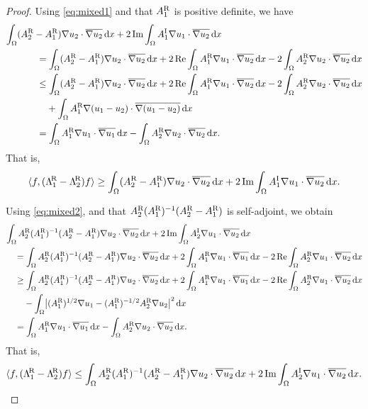 \documentclass[reqno]{amsart}
\numberwithin{equation}{section}
\numberwithin{figure}{section}
\numberwithin{table}{section}
\theoremstyle{plain}
\theoremstyle{definition}
\theoremstyle{remark}
\newcommand{\inner}[1]{\langle#1\rangle}
\newcommand{\redel}{\mathop{\textup{Re}}}
\newcommand{\imdel}{\mathop{\textup{Im}}}
\newcommand{\di}{\mathrm{d}}   %
\newcommand{\upR}{^{\textup{R}}}
\newcommand{\upI}{^{\textup{I}}}
\newcommand{\uptR}{^{\!\textup{R}}}
\newcommand{\LambdaR}{\Lambda\uptR}
\newcommand{\AR}{A\upR}
\newcommand{\AI}{A\upI}
\begin{document}
\begin{proof}
		Using \eqref{eq:mixed1} and that $\AR_1$ is positive definite, we have
		\begin{align*}
			\int_\Omega (\AR_2 - \AR_1)\nabla u_2\cdot\overline{\nabla u_2}\,\di x + 2\imdel\int_\Omega \AI_1\nabla u_1\cdot\overline{\nabla u_2}\,\di x \hspace{-7cm}& \\
			&= \int_\Omega (\AR_2 - \AR_1)\nabla u_2\cdot\overline{\nabla u_2}\,\di x + 2\redel \int_\Omega \AR_1\nabla u_1\cdot\overline{\nabla u_2}\,\di x - 2\int_\Omega \AR_2 \nabla u_2\cdot\overline{\nabla u_2}\,\di x \\
			&\leq \int_\Omega (\AR_2 - \AR_1)\nabla u_2\cdot\overline{\nabla u_2}\,\di x + 2\redel \int_\Omega \AR_1\nabla u_1\cdot\overline{\nabla u_2}\,\di x - 2\int_\Omega \AR_2 \nabla u_2\cdot\overline{\nabla u_2}\,\di x\\
			&\phantom{={}} + \int_\Omega \AR_1\nabla(u_1-u_2)\cdot\overline{\nabla(u_1-u_2)}\,\di x\\
			&= \int_\Omega \AR_1\nabla u_1\cdot\overline{\nabla u_1}\,\di x - \int_\Omega \AR_2 \nabla u_2\cdot\overline{\nabla u_2}\,\di x.
		\end{align*}
		That is, 
		\begin{equation*}
			\inner{f,(\LambdaR_1-\LambdaR_2)f} \geq \int_\Omega (\AR_2 - \AR_1)\nabla u_2\cdot\overline{\nabla u_2}\,\di x + 2\imdel\int_\Omega \AI_1\nabla u_1\cdot\overline{\nabla u_2}\,\di x.
		\end{equation*}
		
		Using \eqref{eq:mixed2}, and that $\AR_2(\AR_1)^{-1}(\AR_2 - \AR_1)$ is self-adjoint, we obtain
		\begin{align*}
			\int_\Omega \AR_2(\AR_1)^{-1}(\AR_2 - \AR_1) \nabla u_2\cdot\overline{\nabla u_2}\,\di x + 2\imdel \int_\Omega \AI_2\nabla u_1\cdot\overline{\nabla u_2}\,\di x \hspace{-9.5cm}& \\
			&= \int_\Omega \AR_2(\AR_1)^{-1}(\AR_2 - \AR_1) \nabla u_2\cdot\overline{\nabla u_2}\,\di x + 2\int_\Omega \AR_1 \nabla u_1\cdot\overline{\nabla u_1}\,\di x - 2\redel \int_\Omega \AR_2\nabla u_1\cdot\overline{\nabla u_2}\,\di x \\
			&\geq \int_\Omega \AR_2(\AR_1)^{-1}(\AR_2 - \AR_1) \nabla u_2\cdot\overline{\nabla u_2}\,\di x + 2\int_\Omega \AR_1 \nabla u_1\cdot\overline{\nabla u_1}\,\di x - 2\redel \int_\Omega \AR_2\nabla u_1\cdot\overline{\nabla u_2}\,\di x \\
			&\phantom{={}} - \int_\Omega \bigl\lvert (\AR_1)^{1/2}\nabla u_1 - (\AR_1)^{-1/2}\AR_2\nabla u_2 \bigr\rvert^2\,\di x \\
			&= \int_\Omega \AR_1\nabla u_1\cdot\overline{\nabla u_1}\,\di x - \int_\Omega \AR_2 \nabla u_2\cdot\overline{\nabla u_2}\,\di x.
		\end{align*}
		That is, 
		\begin{equation*}
			\inner{f,(\LambdaR_1-\LambdaR_2)f} \leq \int_\Omega \AR_2(\AR_1)^{-1}(\AR_2 - \AR_1) \nabla u_2\cdot\overline{\nabla u_2}\,\di x + 2\imdel \int_\Omega \AI_2\nabla u_1\cdot\overline{\nabla u_2}\,\di x. \qedhere
		\end{equation*}
	\end{proof}
	
\end{document}
